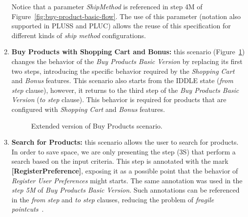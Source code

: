 \documentclass{llncs}
\begin{document}
\begin{enumerate}
 Notice that a parameter \emph{ShipMethod} is referenced in step 4M of Figure~\ref{fig:buy-product-basic-flow}. The use of this parameter (notation also supported in PLUSS and PLUC) allows the reuse of this specification 
for different kinds of \emph{ship method} configurations.


\item {\bf Buy Products with Shopping Cart and Bonus:} this scenario (Figure~\ref{fig:buy-product-changing-flow}) changes the behavior of 
the \emph{Buy Products Basic Version} by replacing its first two steps, introducing the specific behavior required by the \emph{Shopping Cart} and 
\emph{Bonus} features. This scenario also starts from the IDDLE state (\emph{from step} clause), however, it returns to the third step of the \emph{Buy 
Products Basic Version} (\emph{to step} clause). This behavior is required for products that are configured with \emph{Shopping Cart} and \emph{Bonus} features.

\begin{figure}[h]
\caption{Extended version of Buy Products scenario.}
\label{fig:buy-product-changing-flow}
\end{figure}

\item {\bf Search for Products:} this scenario allows the user to search for products. In order to save space, we are only presenting the step (3S) that 
perform a search based on the input criteria. This step is annotated with the mark \mbox{{\bf [RegisterPreference]}}, exposing it as a possible point that the 
behavior of \emph{Register User Preferences} might starts. The same annotation was used in the \emph{step 5M} of \emph{Buy Products Basic Version}. Such 
annotations can be referenced in the \emph{from step} and \emph{to step} clauses, reducing 
the problem of \emph{fragile pointcuts}~\cite{rashid-aosd-2007}.


\end{enumerate}
\end{document}
